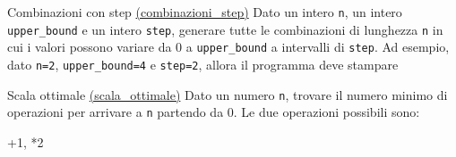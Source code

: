 \begin{esercizio}{Combinazioni con step \href{run:./files/algoritmi/combinazioni_step/}{(combinazioni\_step)}}
	Dato un intero \verb|n|, un intero \verb|upper_bound| e un intero \verb|step|, generare tutte le combinazioni di lunghezza \verb|n| in cui i valori possono variare da $ 0 $ a \verb|upper_bound| a intervalli di \verb|step|. Ad esempio, dato \verb|n=2|, \verb|upper_bound=4| e \verb|step=2|, allora il programma deve stampare
	\begin{center}
		\ttfamily [0,0] [2,0] [0,2] [2,2] [4,0] [0,4] [4,2] [2,4] [4,4]
	\end{center}
\end{esercizio}

\begin{esercizio}{Scala ottimale \href{run:./files/algoritmi/scala_ottimale/}{(scala\_ottimale)}}
	Dato un numero \verb|n|, trovare il numero minimo di operazioni per arrivare a \verb|n| partendo da 0. Le due operazioni possibili sono:
	\begin{center}
		\ttfamily   +1, *2
	\end{center}
\end{esercizio}




